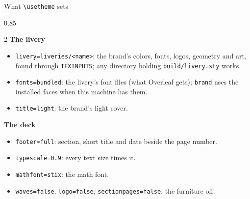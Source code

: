 \documentclass[aspectratio=\engineaspectratio]{beamer}
\begin{document}
\begin{frame}{What \texttt{\textbackslash usetheme} sets}
  \begin{enginescale}{0.85}
    \begin{enginecolumns}{2}
      \enginecolumn
      \textbf{The livery}
      \begin{itemize}
      \item \texttt{livery=liveries/<name>}: the brand's colors, fonts, logos, geometry and art,
        found through \texttt{TEXINPUTS}; any directory holding \texttt{build/livery.sty} works.
      \item \texttt{fonts=bundled}: the livery's font files (what Overleaf gets); \texttt{brand}
        uses the installed faces when this machine has them.
      \item \texttt{title=light}: the brand's light cover.
      \end{itemize}
      \enginecolumn
      \textbf{The deck}
      \begin{itemize}
      \item \texttt{footer=full}: section, short title and date beside the page number.
      \item \texttt{typescale=0.9}: every text size times it.
      \item \texttt{mathfont=stix}: the math font.
      \item \texttt{waves=false}, \texttt{logo=false}, \texttt{sectionpages=false}: the
        furniture off.
      \end{itemize}
    \end{enginecolumns}
  \end{enginescale}
\end{frame}
\end{document}
